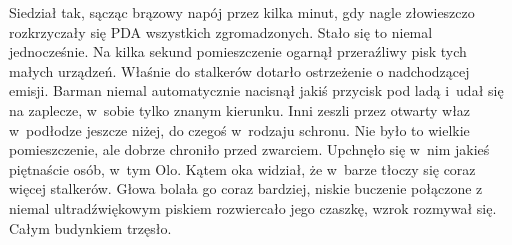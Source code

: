 \documentclass[../MAIN.tex]{subfiles}
\begin{document}
Siedział tak, sącząc brązowy napój przez kilka minut, gdy nagle złowieszczo rozkrzyczały się PDA wszystkich zgromadzonych. Stało się to niemal jednocześnie. Na kilka sekund pomieszczenie ogarnął przeraźliwy pisk tych małych urządzeń. Właśnie do stalkerów dotarło ostrzeżenie o nadchodzącej emisji. Barman niemal automatycznie nacisnął jakiś przycisk pod ladą i~udał się na zaplecze, w~sobie tylko znanym kierunku. Inni zeszli przez otwarty właz w~podłodze jeszcze niżej, do czegoś w~rodzaju schronu. Nie było to wielkie pomieszczenie, ale dobrze chroniło przed zwarciem. Upchnęło się w~nim jakieś piętnaście osób, w~tym Olo. Kątem oka widział, że w~barze tłoczy się coraz więcej stalkerów. Głowa bolała go coraz bardziej, niskie buczenie połączone z niemal ultradźwiękowym piskiem rozwiercało jego czaszkę, wzrok rozmywał się. Całym budynkiem trzęsło.
\end{document}
